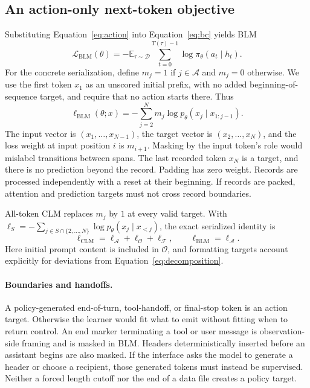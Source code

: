 \documentclass{article} %
\begin{document}
\subsection{An action-only next-token objective}
Substituting Equation~\ref{eq:action} into Equation~\ref{eq:bc} yields BLM
\begin{equation}
 \boxed{\mathcal L_{\mathrm{BLM}}(\theta)
 =-\mathbb E_{\tau\sim\mathcal D}\sum_{t=0}^{T(\tau)-1}
 \log\pi_\theta(a_t\mid h_t).}
 \label{eq:blm}
\end{equation}
For the concrete serialization, define $m_j=1$ if $j\in\mathcal A$ and $m_j=0$ otherwise. We use the first token $x_1$ as an unscored initial prefix, with no added beginning-of-sequence target, and require that no action starts there. Thus
\begin{equation}
 \ell_{\mathrm{BLM}}(\theta;x)
 =-\sum_{j=2}^{N}m_j\log p_\theta(x_j\mid x_{1:j-1}).
 \label{eq:token}
\end{equation}
The input vector is $(x_1,\ldots,x_{N-1})$, the target vector is $(x_2,\ldots,x_N)$, and the loss weight at input position $i$ is $m_{i+1}$. Masking by the input token's role would mislabel transitions between spans. The last recorded token $x_N$ is a target, and there is no prediction beyond the record. Padding has zero weight. Records are processed independently with a reset at their beginning. If records are packed, attention and prediction targets must not cross record boundaries.

All-token CLM replaces $m_j$ by $1$ at every valid target. With $\ell_S=-\sum_{j\in S\cap\{2,\ldots,N\}}\log p_\theta(x_j\mid x_{<j})$, the exact serialized identity is
\begin{equation}
 \ell_{\mathrm{CLM}}=\ell_{\mathcal A}+\ell_{\mathcal O}+\ell_{\mathcal F},
 \qquad \ell_{\mathrm{BLM}}=\ell_{\mathcal A}.
 \label{eq:serialized}
\end{equation}
Here initial prompt content is included in $\mathcal O$, and formatting targets account explicitly for deviations from Equation~\ref{eq:decomposition}.

\paragraph{Boundaries and handoffs.}
A policy-generated end-of-turn, tool-handoff, or final-stop token is an action target. Otherwise the learner would fit what to emit without fitting when to return control. An end marker terminating a tool or user message is observation-side framing and is masked in BLM. Headers deterministically inserted before an assistant begins are also masked. If the interface asks the model to generate a header or choose a recipient, those generated tokens must instead be supervised. Neither a forced length cutoff nor the end of a data file creates a policy target.
\end{document}
